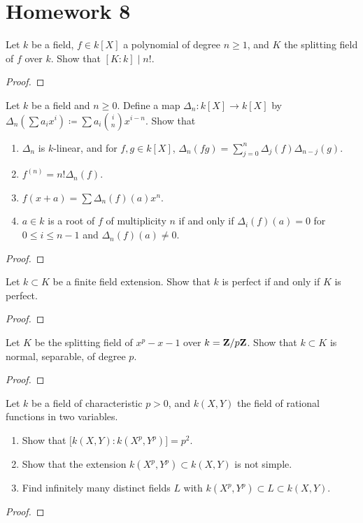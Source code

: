 \chapter{Homework 8}
\begin{problem}
Let $k$ be a field, $f\in k[X]$ a polynomial of degree $n\geq 1$, and $K$
the splitting field of $f$ over $k$. Show that $[K:k]\mid n!$.
\end{problem}
\begin{proof}
\end{proof}

\begin{problem}
Let $k$ be a field and $n\geq 0$. Define a map $\Delta_n\colon k[X]\to
k[X]$ by $\Delta_n\left(\sum a_ix^i\right)\coloneqq\sum a_i\binom{i}{n}
x^{i-n}$. Show that
\begin{enumerate}[label=(\alph*)]
\item $\Delta_n$ is $k$-linear, and for $f,g\in k[X]$,
  $\Delta_n(fg)=\sum_{j=0}^n\Delta_j(f)\Delta_{n-j}(g)$.
\item $f^{(n)}=n!\Delta_n(f)$.
\item $f(x+a)=\sum\Delta_n(f)(a)x^n$.
\item $a\in k$ is a root of $f$ of multiplicity $n$ if and only if
  $\Delta_i(f)(a)=0$ for $0\leq i\leq n-1$ and $\Delta_n(f)(a)\neq 0$.
\end{enumerate}
\end{problem}
\begin{proof}
\end{proof}

\begin{problem}
Let $k\subset K$ be a finite field extension. Show that $k$ is perfect if
and only if $K$ is perfect.
\end{problem}
\begin{proof}
\end{proof}

\begin{problem}
Let $K$ be the splitting field of $x^p-x-1$ over $k=\mathbf{Z}/p\mathbf{Z}$. Show that
$k\subset K$ is normal, separable, of degree $p$.
\end{problem}
\begin{proof}
\end{proof}

\begin{problem}
Let $k$ be a field of characteristic $p>0$, and $k(X,Y)$ the field of
rational functions in two variables.
\begin{enumerate}[label=(\alph*)]
\item Show that $\bigl[k(X,Y):k(X^p,Y^p)\bigr]=p^2$.
\item Show that the extension $k(X^p,Y^p)\subset k(X,Y)$ is not simple.
\item Find infinitely many distinct fields $L$ with $k(X^p,Y^p)\subset
  L\subset k(X,Y)$.
\end{enumerate}
\end{problem}
\begin{proof}
\end{proof}

